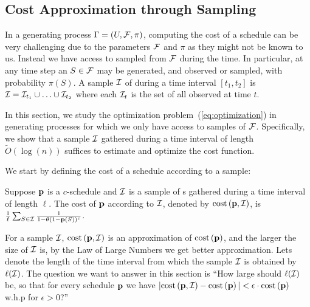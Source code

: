 


\subsection{Cost Approximation through Sampling}\label{sec:sampcomp}
In a generating process $\sys = (U, \F, \pi)$, computing the cost of a schedule can be very challenging due to the parameters $\F$ and $\pi$ as they might not be known to us.
Instead we have access to sampled {\ins} from $\F$ during the time. In particular, at any time step an {\ins} $S\in\F$ may be generated, and observed or sampled, with probability $\pi(S)$. A sample $\S$ of {\ins} during a time interval $[t_1, t_2]$ is $\S=\S_{t_1}\cup\ldots\cup\S_{t_2}$ where each $\S_t$ is the set of all observed {\ins} at time $t$.

In this section, we study the optimization problem~(\ref{eq:optimization}) in generating processes for which we only have access to samples of $\F$. Specifically, we show that a sample $\S$ gathered during a time interval of length $\tilde O(\log(n))$ suffices to estimate and optimize the cost function.


We start by defining the cost of a schedule according to a sample:
\begin{definition}
 Suppose $\p$ is a $c$-schedule and $\S$ is a sample of {\ins}s gathered during a time interval of length $\ell$. The cost of $\p$ according to $\S$, denoted by $\cost{\p,\S}$, is
 $\frac{1}{\ell}\sum_{S\in \S} \frac{1}{1-\theta(1-\p(S))^c}$.
\end{definition}
For a sample $\S$, $\cost{\p,\S}$ is an approximation of $\cost{\p}$, and the larger the size of $\S$ is, by the Law of Large Numbers we get better approximation. Lets denote the length of the time interval from which the sample $\S$ is obtained by $\ell(\S)$. The question we want to answer in this section is ``How large should $\ell(\S)$ be, so that for every schedule $\p$ we have $|\cost{\p,\S} - \cost{\p}| < \epsilon\cdot\cost{\p}$ w.h.p for $\epsilon > 0$?''

